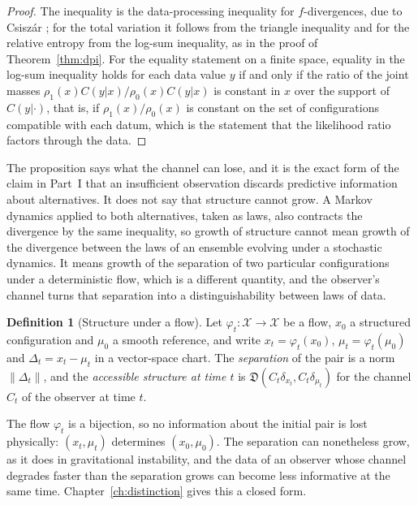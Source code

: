 \documentclass[11pt,oneside]{book}
\theoremstyle{definition}
\newtheorem{definition}[theorem]{Definition}
\theoremstyle{remark}
\begin{document}
\begin{proof}
The inequality is the data-processing inequality for $f$-divergences, due to Csiszár \cite{csiszar1967}; for the total variation it follows from the triangle inequality and for the relative entropy from the log-sum inequality, as in the proof of Theorem~\ref{thm:dpi}. For the equality statement on a finite space, equality in the log-sum inequality holds for each data value $y$ if and only if the ratio of the joint masses $\rho_1(x)C(y|x)/\rho_0(x)C(y|x)$ is constant in $x$ over the support of $C(y|\cdot)$, that is, if $\rho_1(x)/\rho_0(x)$ is constant on the set of configurations compatible with each datum, which is the statement that the likelihood ratio factors through the data.
\end{proof}

The proposition says what the channel can lose, and it is the exact form of the claim in Part~I that an insufficient observation discards predictive information about alternatives. It does not say that structure cannot grow. A Markov dynamics applied to both alternatives, taken as laws, also contracts the divergence by the same inequality, so growth of structure cannot mean growth of the divergence between the laws of an ensemble evolving under a stochastic dynamics. It means growth of the separation of two particular configurations under a deterministic flow, which is a different quantity, and the observer's channel turns that separation into a distinguishability between laws of data.

\begin{definition}[Structure under a flow]
Let $\varphi_t\colon\mathcal X\to\mathcal X$ be a flow, $x_0$ a structured configuration and $\mu_0$ a smooth reference, and write $x_t=\varphi_t(x_0)$, $\mu_t=\varphi_t(\mu_0)$ and $\Delta_t=x_t-\mu_t$ in a vector-space chart. The \emph{separation} of the pair is a norm $\|\Delta_t\|$, and the \emph{accessible structure at time $t$} is $\mathfrak D(C_t\delta_{x_t},C_t\delta_{\mu_t})$ for the channel $C_t$ of the observer at time $t$.
\end{definition}

The flow $\varphi_t$ is a bijection, so no information about the initial pair is lost physically: $(x_t,\mu_t)$ determines $(x_0,\mu_0)$. The separation can nonetheless grow, as it does in gravitational instability, and the data of an observer whose channel degrades faster than the separation grows can become less informative at the same time. Chapter~\ref{ch:distinction} gives this a closed form.
\end{document}
